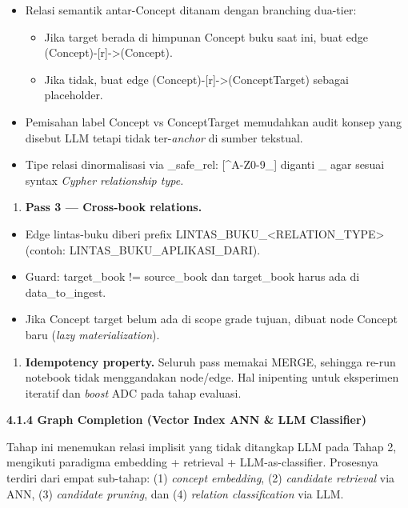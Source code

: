 \documentclass[
]{article}
\begin{document}
\begin{itemize}
\item
  Relasi semantik antar-Concept ditanam dengan branching dua-tier:

  \begin{itemize}
  \item
    Jika target berada di himpunan Concept buku saat ini, buat edge
    (Concept)-{[}r{]}-\textgreater(Concept).
  \item
    Jika tidak, buat edge (Concept)-{[}r{]}-\textgreater(ConceptTarget)
    sebagai placeholder.
  \end{itemize}
\item
  Pemisahan label Concept vs ConceptTarget memudahkan audit konsep yang
  disebut LLM tetapi tidak ter-\emph{anchor} di sumber tekstual.
\item
  Tipe relasi dinormalisasi via \_safe\_rel: {[}\^{}A-Z0-9\_{]} diganti
  \_ agar sesuai syntax \emph{Cypher relationship type.}
\end{itemize}

\begin{enumerate}
\def\labelenumi{\arabic{enumi}.}
\setcounter{enumi}{3}
\item
  \textbf{Pass 3 --- Cross-book relations.}
\end{enumerate}

\begin{itemize}
\item
  Edge lintas-buku diberi prefix
  LINTAS\_BUKU\_\textless RELATION\_TYPE\textgreater{} (contoh:
  LINTAS\_BUKU\_APLIKASI\_DARI).
\item
  Guard: target\_book != source\_book dan target\_book harus ada di
  data\_to\_ingest.
\item
  Jika Concept target belum ada di scope grade tujuan, dibuat node
  Concept baru (\emph{lazy materialization}).
\end{itemize}

\begin{enumerate}
\def\labelenumi{\arabic{enumi}.}
\setcounter{enumi}{4}
\item
  \textbf{Idempotency property.} Seluruh pass memakai MERGE, sehingga
  re-run notebook tidak menggandakan node/edge. Hal inipenting untuk
  eksperimen iteratif dan \emph{boost} ADC pada tahap evaluasi.
\end{enumerate}

\textbf{4.1.4 Graph Completion (Vector Index ANN \& LLM Classifier)}

Tahap ini menemukan relasi implisit yang tidak ditangkap LLM pada Tahap
2, mengikuti paradigma embedding + retrieval + LLM-as-classifier.
Prosesnya terdiri dari empat sub-tahap: (1) \emph{concept embedding},
(2) \emph{candidate retrieval} via ANN, (3) \emph{candidate pruning},
dan (4) \emph{relation classification} via LLM.
\end{document}
